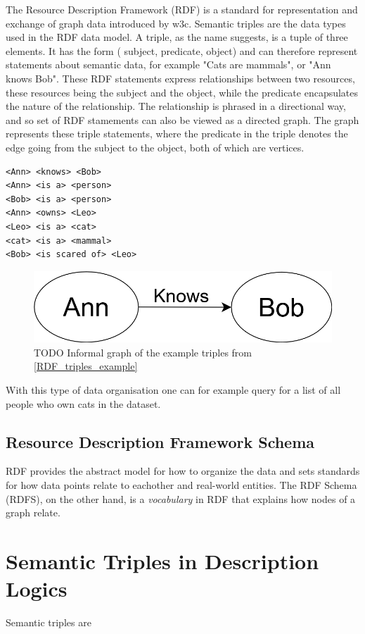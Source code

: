 The Resource Description Framework (RDF) is a standard for representation and exchange of graph data introduced by \gls{w3c}. Semantic triples are the data types used in the RDF data model. A triple, as the name suggests, is a tuple of three elements. It has the form ( subject, predicate, object) and can therefore represent statements about semantic data, for example "Cats are mammals", or "Ann knows Bob". These RDF statements express relationships between two resources, these resources being the subject and the object, while the predicate encapsulates the nature of the relationship. The relationship is phrased in a directional way, and so set of RDF stamements can also be viewed as a directed graph. The graph represents these triple statements, where the predicate in the triple denotes the edge going from the subject to the object, both of which are vertices.

\begin{lstlisting}[caption={Example of RDF triple set written in informal pseudocode},label={RDF_triples_example}]
<Ann> <knows> <Bob>
<Ann> <is a> <person>
<Bob> <is a> <person>
<Ann> <owns> <Leo>
<Leo> <is a> <cat>
<cat> <is a> <mammal>
<Bob> <is scared of> <Leo>
\end{lstlisting}

\begin{figure}
\centering
    \includegraphics[scale=0.3]{figures/RDF_triple}
    \caption{TODO Informal graph of the example triples from \ref{RDF_triples_example}}
    
    \label{fig:KGexample}
\end{figure}

With this type of data organisation one can for example query for a list of all people who own cats in the dataset.

\subsection{Resource Description Framework Schema}
RDF provides the abstract model for how to organize the data and sets standards for how data points relate to eachother and real-world entities. The RDF Schema (RDFS), on the other hand, is a \emph{vocabulary} in RDF that explains how nodes of a graph relate.

\section{Semantic Triples in Description Logics}
Semantic triples are 
\fi
